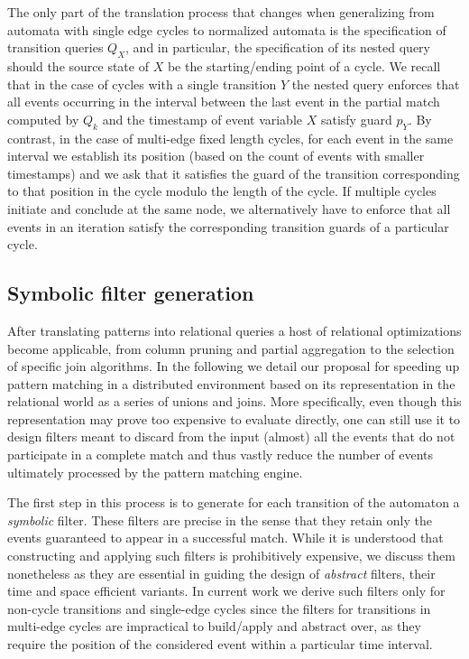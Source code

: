 The only part of the translation process that changes when generalizing from 
automata with single edge cycles to normalized automata is the specification of 
transition queries $Q_X$, and in particular, the specification of its nested 
query should the source state of $X$ be the starting/ending point of a cycle.
We recall that in the case of cycles with a single transition $Y$ the nested 
query enforces that all events occurring in the interval between the last event 
in the partial match computed by $Q_k$ and the timestamp of event variable $X$ 
satisfy guard $p_Y$. 
By contrast, in the case of multi-edge fixed length cycles, for each event in 
the same interval we establish its position (based on  the count of events with 
smaller timestamps) and we ask that it satisfies the guard of the transition 
corresponding to that position in the cycle modulo the length of the cycle.
If multiple cycles initiate and conclude at the same node, we alternatively 
have to enforce that all events in an iteration satisfy the corresponding 
transition guards of a particular cycle.


\subsection{Symbolic filter generation}
\label{sec:prec_filter_generation}



After translating patterns into relational queries a host of relational 
optimizations become applicable, from column pruning and partial aggregation to
the selection of specific join algorithms.
In the following we detail our proposal for speeding up pattern matching in a 
distributed environment based on its representation in the relational world as 
a series of unions and joins.
More specifically, even though this representation may prove too expensive to 
evaluate directly, one can still use it to design filters meant to discard from 
the input (almost) all the events that do not participate in a complete match 
and thus vastly reduce the number of events ultimately processed by the pattern 
matching engine.
 


The first step in this process is to generate for each transition of the 
automaton a {\em symbolic} filter.
These filters are precise in the sense that they retain only the events  
guaranteed to appear in a successful match.
While it is understood that constructing and applying such filters is 
prohibitively expensive, we discuss them nonetheless as they are essential in 
guiding the design of {\em abstract} filters, their time and space efficient 
variants. 
In current work we derive such filters only for non-cycle transitions and 
single-edge cycles since the filters for transitions in multi-edge cycles 
are impractical to build/apply and abstract over, as they require the position 
of the considered event within a particular time interval.



